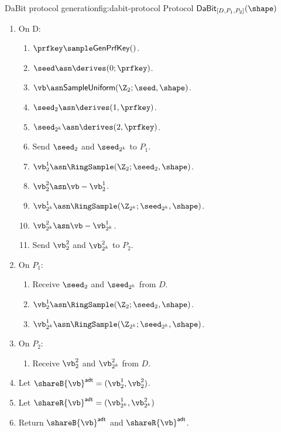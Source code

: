 \begin{Boxfig}{DaBit protocol generation}{fig:dabit-protocol}
  {Protocol $\mathsf{DaBit}_{[D, P_1, P_2]}(\shape)$}
  \begin{enumerate}
  \item On D:
  \begin{enumerate}
    \item $\prfkey \sample \mathsf{GenPrfKey}()$.
    \item $\seed \asn \derives(0; \prfkey)$.
    \item $\vb \asn \mathsf{SampleUniform}(\Z_2; \seed, \shape)$.
    \item $\seed_2 \asn \derives(1, \prfkey)$.
    \item $\seed_{2^k} \asn \derives(2, \prfkey)$.
    \item Send $\seed_2$ and $\seed_{2^k}$ to $P_1$.

    \item $\vb^1_{2} \asn \RingSample(\Z_2; \seed_2, \shape)$.
    \item $\vb^2_{2} \asn \vb - \vb^1_{2}$.
    \item $\vb^1_{2^k} \asn \RingSample(\Z_{2^k}; \seed_{2^k}, \shape)$.
    \item $\vb^2_{2^k} \asn \vb - \vb^1_{2^k}$.
    \item Send $\vb^2_2$ and $\vb^2_{2^k}$ to $P_2$.
  \end{enumerate}

  \item On $P_1$:
 \begin{enumerate}
     \item Receive $\seed_2$ and $\seed_{2^k}$ from $D$.
     \item $\vb^1_{2} \asn \RingSample(\Z_2; \seed_2, \shape)$.
     \item $\vb^1_{2^k} \asn \RingSample(\Z_{2^k}; \seed_{2^k}, \shape)$.
 \end{enumerate}
\item On $P_2$:
\begin{enumerate}
    \item Receive $\vb^2_2$ and $\vb^2_{2^k}$ from $D$.
\end{enumerate}
\item Let $\shareB{\vb}^\mathsf{adt} = (\vb^1_2, \vb^2_2)$.
\item Let $\shareR{\vb}^\mathsf{adt} = (\vb^1_{2^k}, \vb^2_{2^k})$
\item Return $\shareB{\vb}^\mathsf{adt}$ and $\shareR{\vb}^\mathsf{adt}$.
\end{enumerate}
\end{Boxfig}

